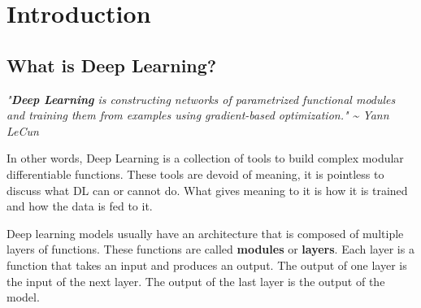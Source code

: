 \chapter{Introduction}

\section{What is Deep Learning?}

\begin{definitionblock}
    \textit{"\textbf{Deep Learning} is constructing networks of parametrized functional modules and training them from examples using gradient-based optimization." \newline
    \phantom{ } \hfill \textasciitilde{} Yann LeCun}
\end{definitionblock}

In other words, Deep Learning is a collection of tools to build complex modular differentiable functions. These tools are devoid of meaning, it is pointless to discuss what DL can or cannot do. What gives meaning to it is how it is trained and how the data is fed to it.

Deep learning models usually have an architecture that is composed of multiple layers of functions. These functions are called \textbf{modules} or \textbf{layers}. Each layer is a function that takes an input and produces an output. The output of one layer is the input of the next layer. The output of the last layer is the output of the model.






